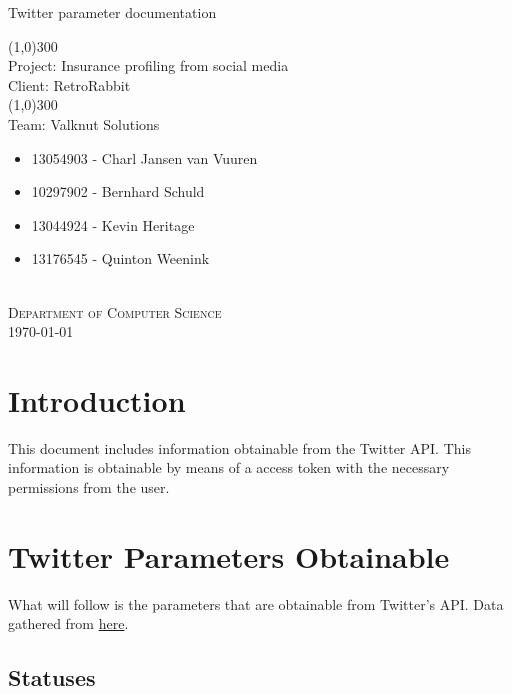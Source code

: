 \documentclass{article}
\begin{document}
	\begin{titlepage}
		\begin{center}
			\huge{
			Twitter parameter documentation\\
			}
			
			\line(1,0){300}\\
			[0.2cm]
			\LARGE{Project: Insurance profiling from social media\\
			Client: RetroRabbit} \\
			\line(1,0){300}\\
			\LARGE{Team: Valknut Solutions}\\
			[1.0cm]
			\large
			{
			\begin{itemize}
				\item 13054903 - Charl Jansen van Vuuren 
				\item 10297902 - Bernhard Schuld      
				\item 13044924 - Kevin Heritage
				\item 13176545 - Quinton Weenink\\
			\end{itemize}
			}
			\textsc{\large}\\
		[3.0cm]
		\textsc{\large  Department of Computer Science}\\
		[0.5cm]
		\textsc{\large \today}\\
		\end{center}

	\end{titlepage}
	\cleardoublepage
	\tableofcontents
	\cleardoublepage
\section{Introduction}
	This document includes information obtainable from the Twitter API. This information is obtainable by means of a access token with the necessary permissions from the user.

\section{Twitter Parameters Obtainable}
	What will follow is the parameters that are obtainable from Twitter's API.
	Data gathered from \href{https://dev.twitter.com/rest/public}{here}.

	\subsection{Statuses}
\end{document}
